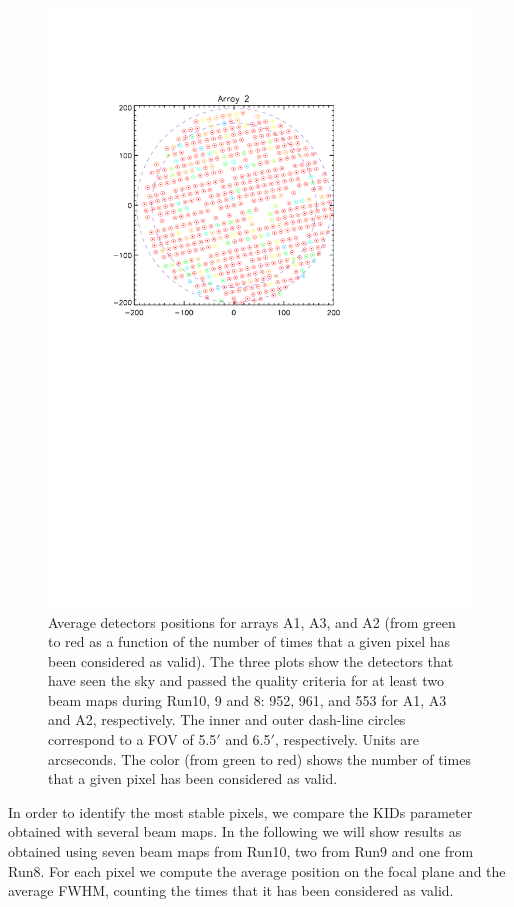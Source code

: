 \begin{figure}
\begin{center}
\includegraphics[trim=2cm 14cm 5cm 4cm, clip=true,width=0.6\linewidth]{Figures/A2_fwhm_color_count.pdf}
\caption{Average detectors positions for arrays A1, A3, and A2 (from
  green to red as a function of the number of times that a given pixel
  has been considered as valid). The three plots show the detectors
  that have seen the sky and passed the quality criteria for at least
  two beam maps during Run10, 9 and 8: 952, 961, and 553
  for A1, A3 and A2, respectively. The inner and outer dash-line circles correspond to a FOV of 5.5$\prime$ and 6.5$\prime$, respectively. Units are arcseconds. The color (from green to red)  shows the number of times that a given pixel has been considered as valid.}
\label{fig:avg_fov_color}
\end{center}
\end{figure}

In order to identify the most stable pixels, we compare the KIDs parameter obtained with several beam maps. 
In the following we will show results as obtained using seven beam maps from Run10, two from Run9 and one from Run8.
For each pixel we compute the average position on the focal plane and the average FWHM, counting the times that it has been considered as valid.

